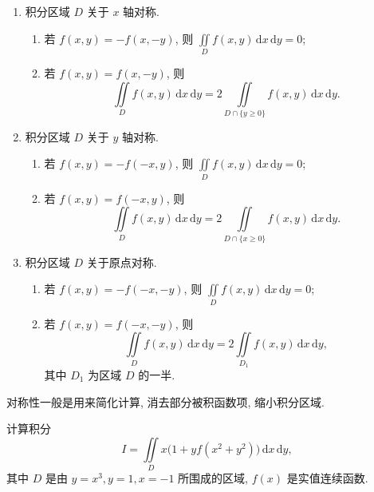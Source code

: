 \documentclass[../数学分析培优讲义.tex]{subfiles}
\begin{document}
\begin{theorem}
\begin{enumerate}[label=(\arabic*)]
    \item 积分区域 $D$ 关于 $x$ 轴对称.
    \begin{enumerate}[label=(\roman*)]
        \item 若 $f(x,y)=-f(x,-y)$, 则 $\displaystyle\iint\limits_Df(x,y)\,\mathrm{d}x\,\mathrm{d}y=0$;
        \item 若 $f(x,y)=f(x,-y)$, 则
        \[
            \iint\limits_Df(x,y)\,\mathrm{d}x\,\mathrm{d}y
            =2\iint\limits_{D\cap\{y\geq0\}}f(x,y)\,\mathrm{d}x\,\mathrm{d}y.
        \]
    \end{enumerate}

    \item 积分区域 $D$ 关于 $y$ 轴对称.
    \begin{enumerate}[label=(\roman*)]
        \item 若 $f(x,y)=-f(-x,y)$, 则 $\displaystyle\iint\limits_Df(x,y)\,\mathrm{d}x\,\mathrm{d}y=0$;
        \item 若 $f(x,y)=f(-x,y)$, 则
        \[
            \iint\limits_Df(x,y)\,\mathrm{d}x\,\mathrm{d}y
            =2\iint\limits_{D\cap\{x\geq0\}}f(x,y)\,\mathrm{d}x\,\mathrm{d}y.
        \]
    \end{enumerate}

    \item 积分区域 $D$ 关于原点对称.
    \begin{enumerate}[label=(\roman*)]
        \item 若 $f(x,y)=-f(-x,-y)$, 则 $\displaystyle\iint\limits_Df(x,y)\,\mathrm{d}x\,\mathrm{d}y=0$;
        \item 若 $f(x,y)=f(-x,-y)$, 则
        \[
            \iint\limits_Df(x,y)\,\mathrm{d}x\,\mathrm{d}y
            =2\iint\limits_{D_1}f(x,y)\,\mathrm{d}x\,\mathrm{d}y,
        \]
        其中 $D_1$ 为区域 $D$ 的一半.
    \end{enumerate}
\end{enumerate}
\end{theorem}

\begin{remark}
对称性一般是用来简化计算, 消去部分被积函数项, 缩小积分区域.
\end{remark}

\begin{example}
计算积分
\[
    I=\iint\limits_Dx\bigl(1+yf(x^2+y^2)\bigr)\,\mathrm{d}x\,\mathrm{d}y,
\]
其中 $D$ 是由 $y=x^3,y=1,x=-1$ 所围成的区域, $f(x)$ 是实值连续函数.
\end{example}
\exampleblank
\end{document}
